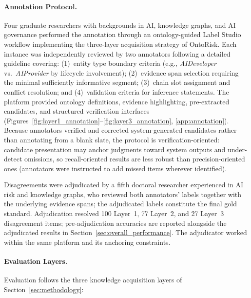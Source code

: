 \documentclass[a4paper,fleqn]{cas-dc}
\begin{document}
\paragraph{Annotation Protocol.}
Four graduate researchers with backgrounds in AI, knowledge graphs,
and AI governance performed the annotation through an ontology-guided
Label Studio workflow implementing the three-layer acquisition
strategy of OntoRisk.
Each instance was independently reviewed by two annotators following a
detailed guideline covering: (1)~entity type boundary criteria (e.g.,
\textit{AIDeveloper} vs.\ \textit{AIProvider} by lifecycle
involvement); (2)~evidence span selection requiring the minimal
sufficiently informative segment; (3)~chain slot assignment and
conflict resolution; and (4)~validation criteria for inference
statements.
The platform provided ontology definitions, evidence highlighting,
pre-extracted candidates, and structured verification interfaces
(Figures~\ref{fig:layer1_annotation}--\ref{fig:layer3_annotation},
\ref{app:annotation}).
Because annotators verified and corrected system-generated candidates
rather than annotating from a blank slate, the protocol is
verification-oriented: candidate presentation may anchor judgments
toward system outputs and under-detect omissions, so recall-oriented
results are less robust than precision-oriented ones (annotators were
instructed to add missed items wherever identified).

Disagreements were adjudicated by a fifth doctoral researcher
experienced in AI risk and knowledge graphs, who reviewed both
annotators' labels together with the underlying evidence spans; the
adjudicated labels constitute the final gold standard.
Adjudication resolved 100 Layer~1, 77 Layer~2, and 27 Layer~3
disagreement items; pre-adjudication accuracies are reported alongside
the adjudicated results in Section~\ref{sec:overall_performance}.
The adjudicator worked within the same platform and its anchoring
constraints.

\paragraph{Evaluation Layers.}
Evaluation follows the three knowledge acquisition layers of
Section~\ref{sec:methodology}:
\end{document}
